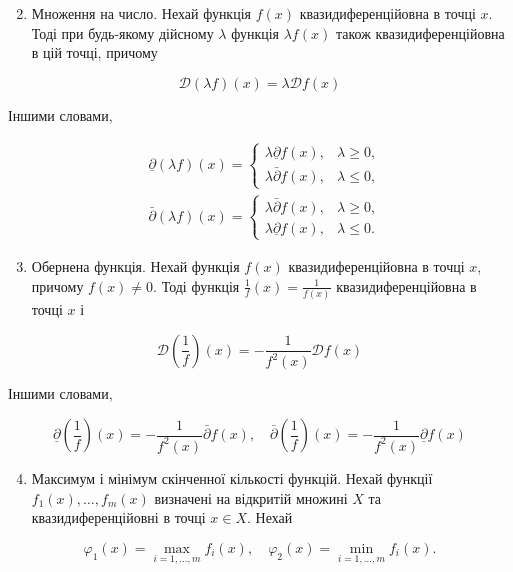 \documentclass[12pt,a4paper]{extarticle}
\numberwithin{section}{part}
\begin{document}
\begin{enumerate}
  \setcounter{enumi}{1}
  \item Множення на число. Нехай функція $f(x)$ квазидиференційовна в точці $x$. Тоді при будь-якому дійсному $\lambda$ функція $\lambda f(x)$ також квазидиференційовна в цій точці, причому
\end{enumerate}

$$
\mathcal{D}(\lambda f)(x)=\lambda \mathcal{D} f(x)
$$

Іншими словами,

$$
\begin{aligned}
& \underline{\partial}(\lambda f)(x)= \begin{cases}\lambda \underline{\partial} f(x), & \lambda \geq 0, \\
\lambda \bar{\partial} f(x), & \lambda \leq 0,\end{cases} \\
& \bar{\partial}(\lambda f)(x)= \begin{cases}\lambda \bar{\partial} f(x), & \lambda \geq 0, \\
\lambda \underline{\partial} f(x), & \lambda \leq 0 .\end{cases}
\end{aligned}
$$

\begin{enumerate}
  \setcounter{enumi}{2}
  \item Обернена функція. Нехай функція $f(x)$ квазидиференційовна в точці $x$, причому $f(x) \neq 0$. Тоді функція $\frac{1}{f}(x)=\frac{1}{f(x)}$ квазидиференційовна в точці $x$ і
\end{enumerate}

$$
\mathcal{D}\left(\frac{1}{f}\right)(x)=-\frac{1}{f^{2}(x)} \mathcal{D} f(x)
$$

Іншими словами,

$$
\underline{\partial}\left(\frac{1}{f}\right)(x)=-\frac{1}{f^{2}(x)} \bar{\partial} f(x), \quad \bar{\partial}\left(\frac{1}{f}\right)(x)=-\frac{1}{f^{2}(x)} \underline{\partial} f(x)
$$

\begin{enumerate}
  \setcounter{enumi}{3}
  \item Максимум і мінімум скінченної кількості функцій. Нехай функції $f_{1}(x), \ldots, f_{m}(x)$ визначені на відкритій множині $X$ та квазидиференційовні в точці $x \in X$. Нехай
\end{enumerate}

$$
\varphi_{1}(x)=\max _{i=1, \ldots, m} f_{i}(x), \quad \varphi_{2}(x)=\min _{i=1, \ldots, m} f_{i}(x) .
$$
\end{document}

